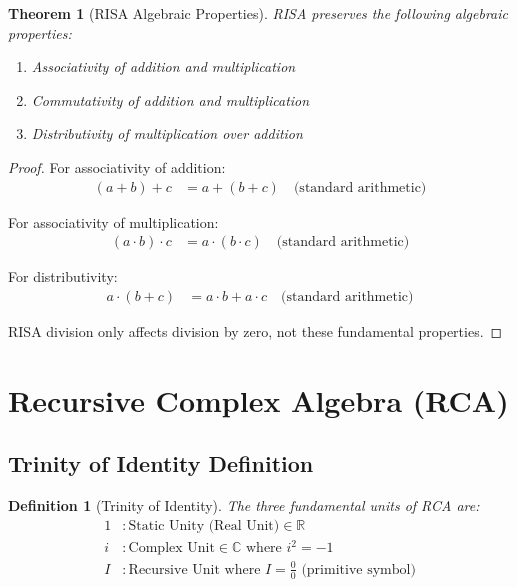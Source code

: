 \documentclass[12pt,a4paper]{article}
\newtheorem{definition}{Definition}
\newtheorem{theorem}{Theorem}
\begin{document}
\begin{theorem}[RISA Algebraic Properties]
RISA preserves the following algebraic properties:
\begin{enumerate}
\item Associativity of addition and multiplication
\item Commutativity of addition and multiplication
\item Distributivity of multiplication over addition
\end{enumerate}
\end{theorem}

\begin{proof}
For associativity of addition:
\begin{align}
(a + b) + c &= a + (b + c) \quad \text{(standard arithmetic)}
\end{align}

For associativity of multiplication:
\begin{align}
(a \cdot b) \cdot c &= a \cdot (b \cdot c) \quad \text{(standard arithmetic)}
\end{align}

For distributivity:
\begin{align}
a \cdot (b + c) &= a \cdot b + a \cdot c \quad \text{(standard arithmetic)}
\end{align}

RISA division only affects division by zero, not these fundamental properties.
\end{proof}

\section{Recursive Complex Algebra (RCA)}

\subsection{Trinity of Identity Definition}

\begin{definition}[Trinity of Identity]
The three fundamental units of RCA are:
\begin{align}
1 &: \text{Static Unity (Real Unit)} \in \mathbb{R} \\
i &: \text{Complex Unit} \in \mathbb{C} \text{ where } i^2 = -1 \\
I &: \text{Recursive Unit} \text{ where } I = \frac{0}{0} \text{ (primitive symbol)}
\end{align}
\end{definition}
\end{document}

